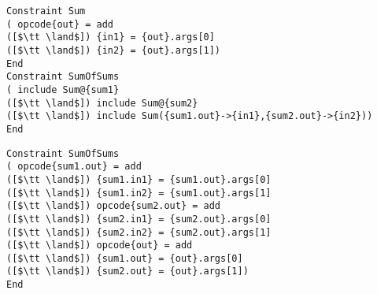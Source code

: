 \begin{lstlisting}[language=CAnDL]
Constraint Sum
( opcode{out} = add
([$\tt \land$]) {in1} = {out}.args[0]
([$\tt \land$]) {in2} = {out}.args[1])
End
Constraint SumOfSums
( include Sum@{sum1}
([$\tt \land$]) include Sum@{sum2}
([$\tt \land$]) include Sum({sum1.out}->{in1},{sum2.out}->{in2}))
End
\end{lstlisting}
\begin{lstlisting}[language=CAnDL,
                   label={fig:inheritsandrenameandrebase},caption=
   {Example for the expansion of {\it include} constraints:
    Both specifications are equivalent.\parfillskip=0pt}]
Constraint SumOfSums
( opcode{sum1.out} = add
([$\tt \land$]) {sum1.in1} = {sum1.out}.args[0]
([$\tt \land$]) {sum1.in2} = {sum1.out}.args[1]
([$\tt \land$]) opcode{sum2.out} = add
([$\tt \land$]) {sum2.in1} = {sum2.out}.args[0]
([$\tt \land$]) {sum2.in2} = {sum2.out}.args[1]
([$\tt \land$]) opcode{out} = add
([$\tt \land$]) {sum1.out} = {out}.args[0]
([$\tt \land$]) {sum2.out} = {out}.args[1])
End
\end{lstlisting}